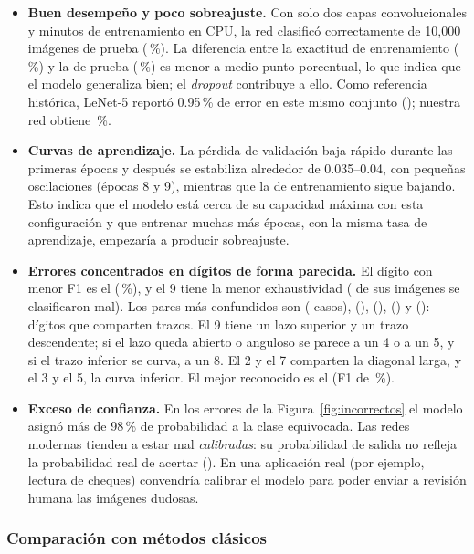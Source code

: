 \documentclass[11pt,letterpaper]{article}
\makeatletter
\newcommand{\pct}{\,\%}
\newcommand{\cit@chk}[1]{\ifcsdef{citA@#1}{}{\PackageError{citas}{Cita no definida: #1}{}}}
\newcommand{\cit@item}[1]{\cit@chk{#1}\cit@sep\csuse{citA@#1}, \csuse{citY@#1}\gdef\cit@sep{; }}
\newcommand{\parencite}[1]{(\gdef\cit@sep{}\forcsvlist{\cit@item}{#1})}
\makeatother
\begin{document}
\begin{itemize}
  \item \textbf{Buen desempeño y poco sobreajuste.} Con solo dos capas convolucionales y \TiempoEntMin{} minutos de entrenamiento en CPU, la red clasificó correctamente \NAciertosTest{} de 10{,}000 imágenes de prueba (\AccTest\pct{}). La diferencia entre la exactitud de entrenamiento (\AccTrain\pct{}) y la de prueba (\AccTest\pct{}) es menor a medio punto porcentual, lo que indica que el modelo generaliza bien; el \emph{dropout} contribuye a ello. Como referencia histórica, LeNet-5 reportó 0.95\pct{} de error en este mismo conjunto \parencite{lecun1998}; nuestra red obtiene \ErrTest\pct{}.
  \item \textbf{Curvas de aprendizaje.} La pérdida de validación baja rápido durante las primeras épocas y después se estabiliza alrededor de 0.035--0.04, con pequeñas oscilaciones (épocas 8 y 9), mientras que la de entrenamiento sigue bajando. Esto indica que el modelo está cerca de su capacidad máxima con esta configuración y que entrenar muchas más épocas, con la misma tasa de aprendizaje, empezaría a producir sobreajuste.
  \item \textbf{Errores concentrados en dígitos de forma parecida.} El dígito con menor F1 es el \PeorClase{} (\PeorClaseF\pct{}), y el 9 tiene la menor exhaustividad (\ErroresNueve{} de sus imágenes se clasificaron mal). Los pares más confundidos son \ParA{} (\ParAN{} casos), \ParB{} (\ParBN), \ParC{} (\ParCN), \ParD{} (\ParDN) y \ParE{} (\ParEN): dígitos que comparten trazos. El 9 tiene un lazo superior y un trazo descendente; si el lazo queda abierto o anguloso se parece a un 4 o a un 5, y si el trazo inferior se curva, a un 8. El 2 y el 7 comparten la diagonal larga, y el 3 y el 5, la curva inferior. El mejor reconocido es el \MejorClase{} (F1 de \MejorClaseF\pct{}).
  \item \textbf{Exceso de confianza.} En los errores de la Figura~\ref{fig:incorrectos} el modelo asignó más de 98\pct{} de probabilidad a la clase equivocada. Las redes modernas tienden a estar mal \emph{calibradas}: su probabilidad de salida no refleja la probabilidad real de acertar \parencite{guo2017}. En una aplicación real (por ejemplo, lectura de cheques) convendría calibrar el modelo para poder enviar a revisión humana las imágenes dudosas.
\end{itemize}

\subsubsection{Comparación con métodos clásicos}
\label{sec:clasicos}
\end{document}
